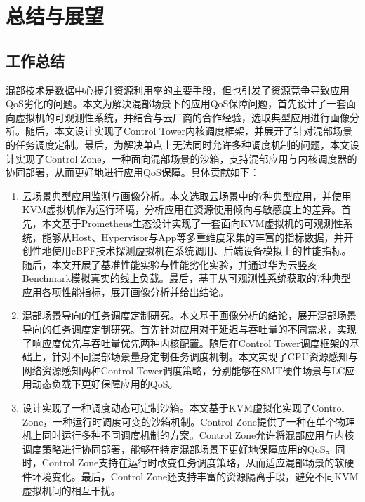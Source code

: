 \chapter{总结与展望}\label{chap:theories_tech}


\section{工作总结}

混部技术是数据中心提升资源利用率的主要手段，但也引发了资源竞争导致应用QoS劣化的问题。本文为解决混部场景下的应用QoS保障问题，首先设计了一套面向虚拟机的可观测性系统，并结合与云厂商的合作经验，选取典型应用进行画像分析。随后，本文设计实现了Control Tower内核调度框架，并展开了针对混部场景的任务调度定制。最后，为解决单点上无法同时允许多种调度机制的问题，本文设计实现了Control Zone，一种面向混部场景的沙箱，支持混部应用与内核调度器的协同部署，从而更好地进行应用QoS保障。具体贡献如下：

\begin{enumerate}
    \item 云场景典型应用监测与画像分析。本文选取云场景中的7种典型应用，并使用KVM虚拟机作为运行环境，分析应用在资源使用倾向与敏感度上的差异。首先，本文基于Prometheus生态设计实现了一套面向KVM虚拟机的可观测性系统，能够从Host、Hypervisor与App等多重维度采集的丰富的指标数据，并开创性地使用eBPF技术探测虚拟机在系统调用、后端设备模拟上的性能指标。随后，本文开展了基准性能实验与性能劣化实验，并通过华为云竖亥Benchmark模拟真实的线上负载。最后，基于从可观测性系统获取的7种典型应用各项性能指标，展开画像分析并给出结论。

    \item 混部场景导向的任务调度定制研究。本文基于画像分析的结论，展开混部场景导向的任务调度定制研究。首先针对应用对于延迟与吞吐量的不同需求，实现了响应度优先与吞吐量优先两种内核配置。随后在Control Tower调度框架的基础上，针对不同混部场景量身定制任务调度机制。本文实现了CPU资源感知与网络资源感知两种Control Tower调度策略，分别能够在SMT硬件场景与LC应用动态负载下更好保障应用的QoS。

    \item 设计实现了一种调度动态可定制沙箱。本文基于KVM虚拟化实现了Control Zone，一种运行时调度可变的沙箱机制。Control Zone提供了一种在单个物理机上同时运行多种不同调度机制的方案。Control Zone允许将混部应用与内核调度策略进行协同部署，能够在特定混部场景下更好地保障应用的QoS。同时，Control Zone支持在运行时改变任务调度策略，从而适应混部场景的软硬件环境变化。最后，Control Zone还支持丰富的资源隔离手段，避免不同KVM虚拟机间的相互干扰。

\end{enumerate}

